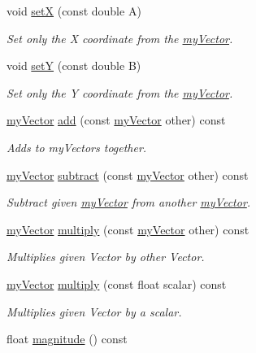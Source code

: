 \begin{DoxyCompactItemize}
\item 
void \hyperlink{classmy_vector_af5d310b4175917d94960f8d8a915583d}{set\+X} (const double A)
\begin{DoxyCompactList}\small\item\em Set only the X coordinate from the \hyperlink{classmy_vector}{my\+Vector}. \end{DoxyCompactList}\item 
void \hyperlink{classmy_vector_a67046769203977128c5869519a96981c}{set\+Y} (const double B)
\begin{DoxyCompactList}\small\item\em Set only the Y coordinate from the \hyperlink{classmy_vector}{my\+Vector}. \end{DoxyCompactList}\item 
\hyperlink{classmy_vector}{my\+Vector} \hyperlink{classmy_vector_ab6e4440c74a6cd118faa925a8fddedc9}{add} (const \hyperlink{classmy_vector}{my\+Vector} other) const 
\begin{DoxyCompactList}\small\item\em Adds to my\+Vectors together. \end{DoxyCompactList}\item 
\hyperlink{classmy_vector}{my\+Vector} \hyperlink{classmy_vector_a43d29af4b84766a8b27c0a6e50067ead}{subtract} (const \hyperlink{classmy_vector}{my\+Vector} other) const 
\begin{DoxyCompactList}\small\item\em Subtract given \hyperlink{classmy_vector}{my\+Vector} from another \hyperlink{classmy_vector}{my\+Vector}. \end{DoxyCompactList}\item 
\hyperlink{classmy_vector}{my\+Vector} \hyperlink{classmy_vector_a34a7a3b4eeda62cf4e8dfa5e3e79fcaa}{multiply} (const \hyperlink{classmy_vector}{my\+Vector} other) const 
\begin{DoxyCompactList}\small\item\em Multiplies given Vector by other Vector. \end{DoxyCompactList}\item 
\hyperlink{classmy_vector}{my\+Vector} \hyperlink{classmy_vector_a9465f76761927752eea5a66664443500}{multiply} (const float scalar) const 
\begin{DoxyCompactList}\small\item\em Multiplies given Vector by a scalar. \end{DoxyCompactList}\item 
float \hyperlink{classmy_vector_a69838d6c85759fa2a2c82ea42f13b989}{magnitude} () const 

\end{DoxyCompactItemize}
